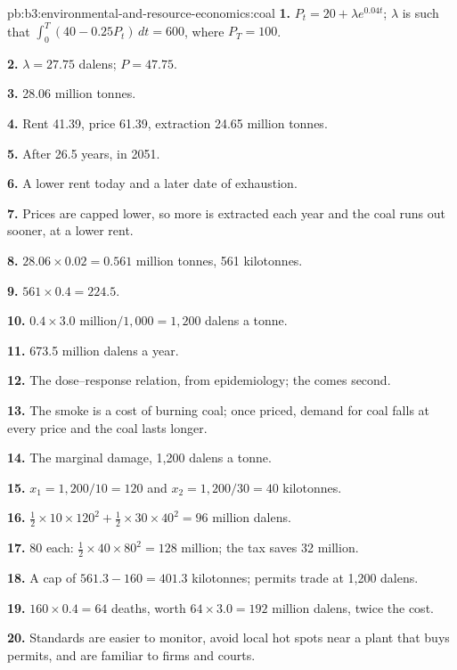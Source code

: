 \begin{solution}{pb:b3:environmental-and-resource-economics:coal}
\textbf{1.} $P_t = 20 + \lambda e^{0.04t}$; $\lambda$ is such that $\int_0^T (40 - 0.25P_t)\,dt = 600$, where $P_T = 100$.

\textbf{2.} $\lambda = 27.75$ dalens; $P = 47.75$.

\textbf{3.} 28.06 million tonnes.

\textbf{4.} Rent 41.39, price 61.39, extraction 24.65 million tonnes.

\textbf{5.} After 26.5 years, in 2051.

\textbf{6.} A lower rent today and a later date of exhaustion.

\textbf{7.} Prices are capped lower, so more is extracted each year and the coal runs
out sooner, at a lower rent.

\textbf{8.} $28.06 \times 0.02 = 0.561$ million tonnes, 561 kilotonnes.

\textbf{9.} $561 \times 0.4 = 224.5$.

\textbf{10.} $0.4 \times 3.0 \text{ million}/1{,}000 = 1{,}200$ dalens a tonne.

\textbf{11.} 673.5 million dalens a year.

\textbf{12.} The dose--response relation, from epidemiology; the 
comes second.

\textbf{13.} The smoke is a cost of burning coal; once priced, demand for coal falls at
every price and the coal lasts longer.

\textbf{14.} The marginal damage, 1{,}200 dalens a tonne.

\textbf{15.} $x_1 = 1{,}200/10 = 120$ and $x_2 = 1{,}200/30 = 40$ kilotonnes.

\textbf{16.} $\tfrac12 \times 10 \times 120^2 + \tfrac12 \times 30 \times 40^2 = 96$ million dalens.

\textbf{17.} 80 each: $\tfrac12 \times 40 \times 80^2 = 128$ million; the tax saves 32 million.

\textbf{18.} A cap of $561.3 - 160 = 401.3$ kilotonnes; permits trade at 1{,}200 dalens.

\textbf{19.} $160 \times 0.4 = 64$ deaths, worth $64 \times 3.0 = 192$ million dalens, twice the cost.

\textbf{20.} Standards are easier to monitor, avoid local hot spots near a plant that
buys permits, and are familiar to firms and courts.


\end{solution}
